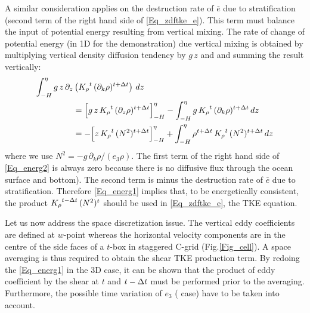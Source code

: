 A similar consideration applies on the destruction rate of $\bar{e}$ due to stratification 
(second term of the right hand side of \eqref{Eq_zdftke_e}). This term 
must balance the input of potential energy resulting from vertical mixing. 
The rate of change of potential energy (in 1D for the demonstration) due vertical 
mixing is obtained by multiplying vertical density diffusion 
tendency by $g\,z$ and and summing the result vertically:
\begin{equation} \label{Eq_energ2}
\begin{split}
\int_{-H}^{\eta} g\,z\,\partial_z &\left( {K_\rho}^t \,(\partial_k \rho)^{t+\Delta t}   \right) \,dz    \\
&= \Bigl[  g\,z \,{K_\rho}^t \,(\partial_z \rho)^{t+\Delta t} \Bigr]_{-H}^{\eta}  
   - \int_{-H}^{\eta}{ g \,{K_\rho}^t \,(\partial_k \rho)^{t+\Delta t} } \,dz   \\
&= - \Bigl[  z\,{K_\rho}^t \,(N^2)^{t+\Delta t} \Bigr]_{-H}^{\eta}
+ \int_{-H}^{\eta}{  \rho^{t+\Delta t} \, {K_\rho}^t \,(N^2)^{t+\Delta t} \,dz  }
\end{split}
\end{equation}
where we use $N^2 = -g \,\partial_k \rho / (e_3 \rho)$. 
The first term of the right hand side of \eqref{Eq_energ2}  is always zero 
because there is no diffusive flux through the ocean surface and bottom). 
The second term is minus the destruction rate of  $\bar{e}$ due to stratification. 
Therefore \eqref{Eq_energ1} implies that, to be energetically consistent, the product 
${K_\rho}^{t-\Delta t}\,(N^2)^t$ should be used in \eqref{Eq_zdftke_e}, the TKE equation.

Let us now address the space discretization issue. 
The vertical eddy coefficients are defined at $w$-point whereas the horizontal velocity 
components are in the centre of the side faces of a $t$-box in staggered C-grid 
(Fig.\ref{Fig_cell}). A space averaging is thus required to obtain the shear TKE production term.
By redoing the \eqref{Eq_energ1} in the 3D case, it can be shown that the product of 
eddy coefficient by the shear at $t$ and $t-\Delta t$ must be performed prior to the averaging.
Furthermore, the possible time variation of $e_3$ ( case) have to be taken into 
account.

